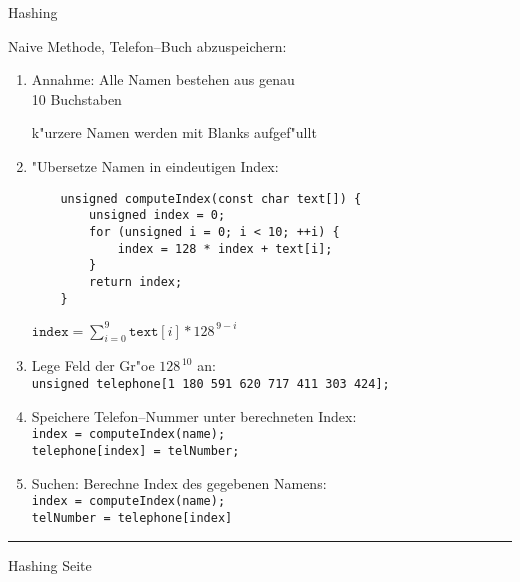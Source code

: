 \documentclass{slides}
\newcounter{mypage}
\begin{document}
\begin{center}
Hashing
\end{center}


\footnotesize
Naive Methode, Telefon--Buch abzuspeichern:
\begin{enumerate}
\item Annahme: Alle Namen bestehen aus genau \\
      10 Buchstaben 

      k"urzere Namen werden mit Blanks aufgef"ullt
\item "Ubersetze Namen in eindeutigen Index:
    \begin{verbatim}
    unsigned computeIndex(const char text[]) {
        unsigned index = 0;
        for (unsigned i = 0; i < 10; ++i) {
            index = 128 * index + text[i];
        }
        return index;
    }
    \end{verbatim} 
    \vspace*{-1.0cm}

    \hspace*{1.0cm} $\mathtt{index} = \sum\limits_{i=0}^9 \mathtt{text}[i] * 128^{\,9-i}$
\item Lege Feld der Gr"o\3e $128^{\,10}$ an: \\[0.3cm]
      \hspace*{1.3cm} \texttt{unsigned telephone[1\,180\,591\,620\,717\,411\,303\,424];}
\item Speichere Telefon--Nummer unter berechneten Index: \\[0.3cm]
      \hspace*{1.3cm} \texttt{index = computeIndex(name);} \\[0.3cm]
      \hspace*{1.3cm} \texttt{telephone[index] = telNumber;}
\item Suchen: Berechne Index des gegebenen Namens: \\[0.3cm]
      \hspace*{1.3cm} \texttt{index = computeIndex(name);} \\[0.3cm]
      \hspace*{1.3cm} \texttt{telNumber = telephone[index]}
\end{enumerate}


\vspace*{0.2cm}

\scriptsize

\vspace*{\fill}
\tiny \addtocounter{mypage}{1}
\rule{17cm}{1mm}
Hashing   \hspace*{\fill} Seite 



\end{document}
